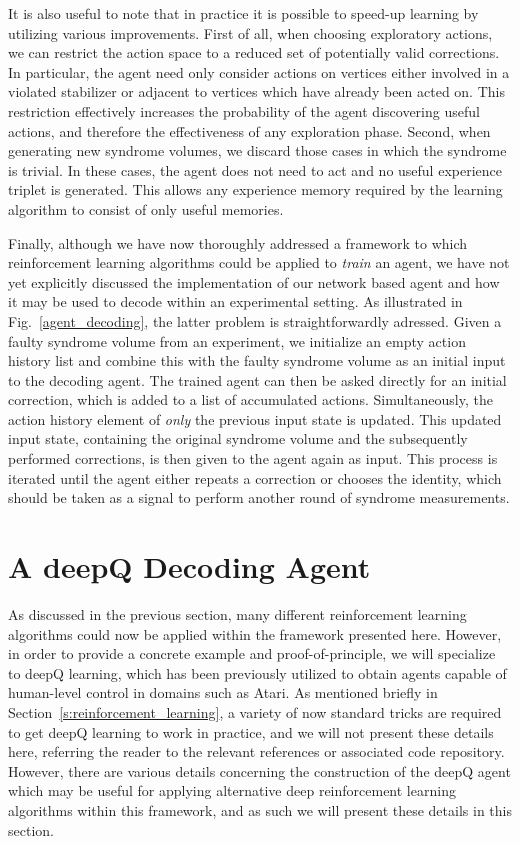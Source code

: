 \documentclass[twocolumn,preprintnumbers,amsmath,amssymb,notitlepage,nofootinbib,longbibliography,superscriptaddress,aps,pra,10pt]{revtex4-1}
\begin{document}
	It is also useful to note that in practice it is possible to speed-up learning by utilizing various improvements.
	First of all, when choosing exploratory actions, we can restrict the action space to a reduced set of potentially valid corrections.
	In particular, the agent need only consider actions on vertices either involved in a violated stabilizer or adjacent to vertices which have already been acted on.
	This restriction effectively increases the probability of the agent discovering useful actions, and therefore the effectiveness of any exploration phase.
	Second, when generating new syndrome volumes, we discard those cases in which the syndrome is trivial. In these cases, the agent does not need to act and no useful
	experience triplet is generated. This allows any experience memory required by the learning algorithm to consist of only useful memories.

	Finally, although we have now thoroughly addressed a framework to which reinforcement learning algorithms could be applied to \textit{train} an agent, we have not yet explicitly discussed
	the implementation of our network based agent and how it may be used to decode within an experimental setting.
	As illustrated in Fig.~\ref{agent_decoding}, the latter problem is straightforwardly adressed.
	Given a faulty syndrome volume from an experiment, we initialize an empty action history list and combine this with the faulty syndrome volume as an initial input to the decoding agent.
	The trained agent can then be asked directly for an initial correction, which is added to a list of accumulated actions. Simultaneously, the action history element of \textit{only} the
	previous input state is updated. This updated input state, containing the original syndrome volume and the subsequently performed corrections,
	is then given to the agent again as input. This process is iterated until the agent either repeats a correction or chooses the identity, which should be taken as a signal to perform
	another round of syndrome measurements.

\section{A deepQ Decoding Agent}\label{s:dq_agent}

	As discussed in the previous section, many different reinforcement learning algorithms could now be applied within the framework presented here.
	However, in order to provide a concrete example and proof-of-principle, we will specialize to deepQ learning, which has been previously utilized to obtain agents capable of human-level control in domains such as Atari.
	As mentioned briefly in Section~\ref{s:reinforcement_learning}, a variety of now standard tricks are required to get deepQ learning to work in practice, and we will not present these details here, referring the reader to the relevant references or associated code repository.
	However, there are various details concerning the construction of the deepQ agent which may be useful for applying alternative deep reinforcement learning algorithms within this framework, and as such we will present these details in this section.
\end{document}
